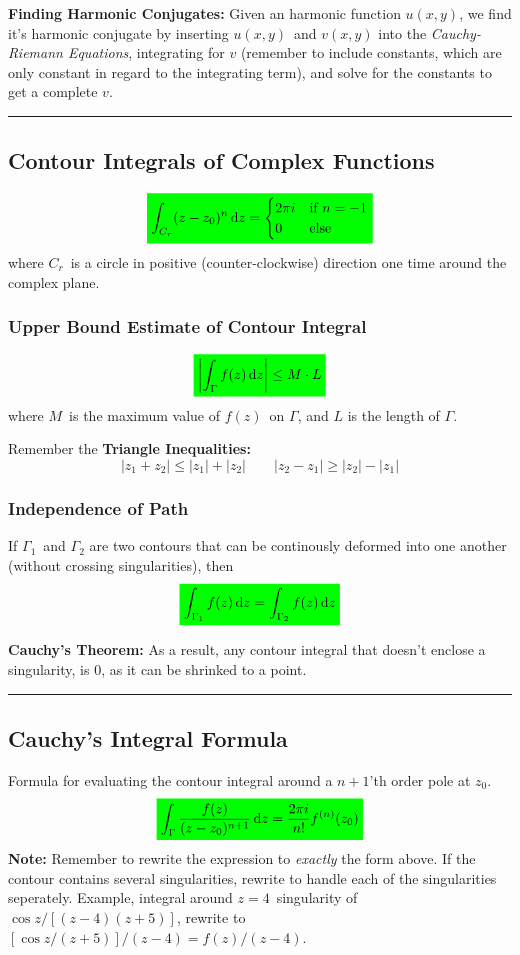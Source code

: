 \documentclass[10pt,a4paper]{article}
\newcommand{\holine}[1][\medskipamount]{\par\vspace*{\dimexpr-\parskip-\baselineskip+#1}\noindent\rule{\linewidth}{1pt}\par\vspace*{\dimexpr-\parskip-.5\baselineskip+#1}}
\newcommand{\gr}[1]{\colorbox{green}{$\displaystyle #1$}}
\begin{document}
\begin{multicols}{2}
\textbf{Finding Harmonic Conjugates:} Given an harmonic function $u(x,y)$, we find it's harmonic conjugate by inserting $u(x,y)$ and $v(x,y)$ into the \textit{Cauchy-Riemann Equations}, integrating for $v$ (remember to include constants, which are only constant in regard to the integrating term), and solve for the constants to get a complete $v$.


\holine
\subsection*{Contour Integrals of Complex Functions}
\[\gr{
    \int_{C_r} (z-z_0)^n \dd{z} = \begin{cases}
    2\pi i &\text{if} \ n=-1 \\
    0 &\text{else}
    \end{cases}
}\]
where $C_r$ is a circle in positive (counter-clockwise) direction one time around the complex plane.

\subsubsection*{Upper Bound Estimate of Contour Integral}
\[\gr{
    \qty|\int_\Gamma f(z) \dd{z}| \leq M\cdot L
}\]
where $M$ is the maximum value of $f(z)$ on $\Gamma$, and $L$ is the length of $\Gamma$.

Remember the \textbf{Triangle Inequalities:}
\[
    |z_1 + z_2| \leq |z_1| + |z_2| \quad\quad |z_2 - z_1| \geq |z_2| - |z_1|
\]


\subsubsection*{Independence of Path}
If $\Gamma_1$ and $\Gamma_2$ are two contours that can be continously deformed into one another (without crossing singularities), then
\[\gr{
    \int_{\Gamma_1} f(z) \dd{z} = \int_{\Gamma_2} f(z) \dd{z}
}\]

\textbf{Cauchy's Theorem:} As a result, any contour integral that doesn't enclose a singularity, is 0, as it can be shrinked to a point.



\holine
\subsection*{Cauchy's Integral Formula}
Formula for evaluating the contour integral around a $n+1$'th order pole at $z_0$.
\[\gr{
    \int_\Gamma \frac{f(z)}{(z-z_0)^{n+1}}\dd{z} = \frac{2\pi i}{n!}f^{(n)}(z_0)
}\]
\textbf{Note:} Remember to rewrite the expression to \textit{exactly} the form above. If the contour contains several singularities, rewrite to handle each of the singularities seperately. Example, integral around $z=4$ singularity of $\cos{z}/[(z-4)(z+5)]$, rewrite to $[\cos{z}/(z+5)]/(z-4) = f(z)/(z-4)$.




\end{multicols}
\end{document}
